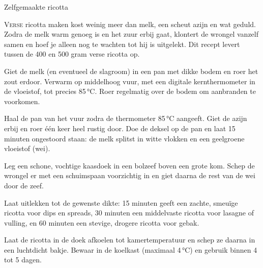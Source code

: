 \begin{recipe}{Zelfgemaakte ricotta}
\label{recipe:ricotta}


\lettrine{V}{erse} ricotta maken kost weinig meer dan melk, een scheut azijn
en wat geduld. Zodra de melk warm genoeg is en het zuur erbij gaat, klontert
de wrongel vanzelf samen en hoef je alleen nog te wachten tot hij is
uitgelekt. Dit recept levert tussen de 400 en 500 gram verse ricotta op.

\begin{ingredients}
\end{ingredients}

\begin{steps}
  \item Giet de melk (en eventueel de slagroom) in een pan met dikke bodem en
        roer het zout erdoor. Verwarm op middelhoog vuur, met een
        digitale kernthermometer in de vloeistof, tot precies 85\,°C. Roer
        regelmatig over de bodem om aanbranden te voorkomen.
  \item Haal de pan van het vuur zodra de thermometer 85\,°C aangeeft. Giet
        de azijn erbij en roer één keer heel rustig door. Doe de deksel op
        de pan en laat 15 minuten ongestoord staan: de melk splitst in
        witte vlokken en een geelgroene vloeistof (wei).
  \item Leg een schone, vochtige kaasdoek in een bolzeef boven een grote kom.
        Schep de wrongel er met een schuimspaan voorzichtig in en giet
        daarna de rest van de wei door de zeef.
  \item Laat uitlekken tot de gewenste dikte: 15 minuten geeft een zachte,
        smeuïge ricotta voor dips en spreads, 30 minuten een middelvaste
        ricotta voor lasagne of vulling, en 60 minuten een stevige, drogere
        ricotta voor gebak.
  \item Laat de ricotta in de doek afkoelen tot kamertemperatuur en schep ze
        daarna in een luchtdicht bakje. Bewaar in de koelkast (maximaal
        4\,°C) en gebruik binnen 4 tot 5 dagen.
\end{steps}
\end{recipe}
